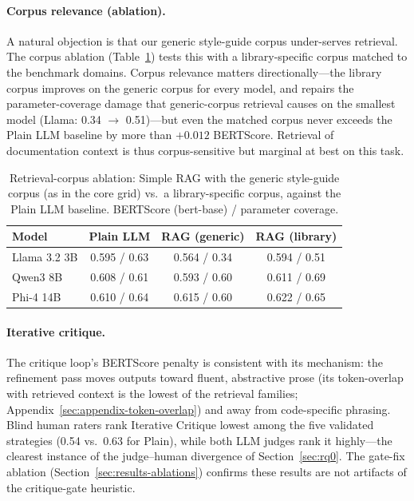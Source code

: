 \documentclass[pdflatex,sn-mathphys-ay]{sn-jnl}%
\theoremstyle{thmstyleone}%
\theoremstyle{thmstyletwo}%
\theoremstyle{thmstylethree}%
\begin{document}
\paragraph{Corpus relevance (ablation).}
A natural objection is that our generic style-guide corpus under-serves retrieval. The corpus ablation (Table~\ref{tab:corpus-ablation}) tests this with a library-specific corpus matched to the benchmark domains. Corpus relevance matters directionally---the library corpus improves on the generic corpus for every model, and repairs the parameter-coverage damage that generic-corpus retrieval causes on the smallest model (Llama: 0.34 $\rightarrow$ 0.51)---but even the matched corpus never exceeds the Plain LLM baseline by more than $+0.012$ BERTScore. Retrieval of documentation context is thus corpus-sensitive but marginal at best on this task.

\begin{table}[h]
\centering
\small
\caption{Retrieval-corpus ablation: Simple RAG with the generic style-guide corpus (as in the core grid) vs.\ a library-specific corpus, against the Plain LLM baseline. BERTScore (bert-base) / parameter coverage.}
\label{tab:corpus-ablation}
\begin{tabular}{lccc}
\toprule
\textbf{Model} & \textbf{Plain LLM} & \textbf{RAG (generic)} & \textbf{RAG (library)} \\
\midrule
Llama 3.2 3B & 0.595 / 0.63 & 0.564 / 0.34 & 0.594 / 0.51 \\
Qwen3 8B     & 0.608 / 0.61 & 0.593 / 0.60 & 0.611 / 0.69 \\
Phi-4 14B    & 0.610 / 0.64 & 0.615 / 0.60 & 0.622 / 0.65 \\
\bottomrule
\end{tabular}
\end{table}

\paragraph{Iterative critique.}
The critique loop's BERTScore penalty is consistent with its mechanism: the refinement pass moves outputs toward fluent, abstractive prose (its token-overlap with retrieved context is the lowest of the retrieval families; Appendix~\ref{sec:appendix-token-overlap}) and away from code-specific phrasing. Blind human raters rank Iterative Critique lowest among the five validated strategies (0.54 vs.\ 0.63 for Plain), while both LLM judges rank it highly---the clearest instance of the judge--human divergence of Section~\ref{sec:rq0}. The gate-fix ablation (Section~\ref{sec:results-ablations}) confirms these results are not artifacts of the critique-gate heuristic.
\end{document}
